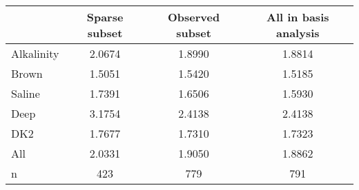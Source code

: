 \begin{tabular}{lccc}
\toprule
 & Sparse subset & Observed subset & All in basis analysis \\
\midrule
Alkalinity & 2.0674 & 1.8990 & 1.8814 \\
Brown & 1.5051 & 1.5420 & 1.5185 \\
Saline & 1.7391 & 1.6506 & 1.5930 \\
Deep & 3.1754 & 2.4138 & 2.4138 \\
DK2 & 1.7677 & 1.7310 & 1.7323 \\
All & 2.0331 & 1.9050 & 1.8862 \\
n & 423 & 779 & 791 \\
\bottomrule
\end{tabular}
